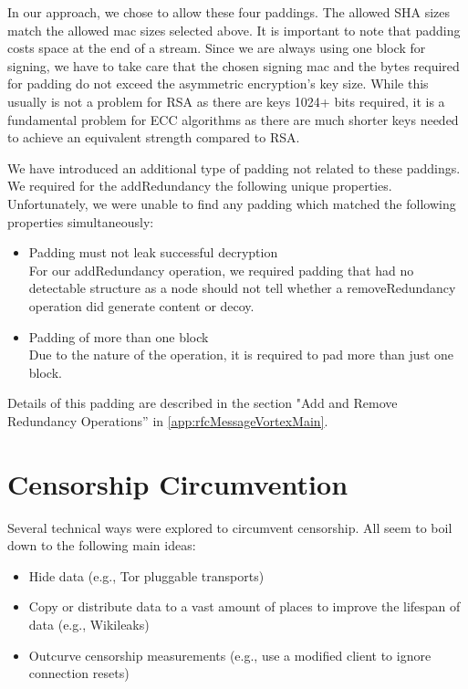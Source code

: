 In our approach, we chose to allow these four paddings. The allowed SHA sizes match the allowed mac sizes selected above. It is important to note that padding costs space at the end of a stream. Since we are always using one block for signing, we have to take care that the chosen signing mac and the bytes required for padding do not exceed the asymmetric encryption's key size. While this usually is not a problem for RSA as there are keys 1024+ bits required, it is a fundamental problem for ECC algorithms as there are much shorter keys needed to achieve an equivalent strength compared to RSA. 

We have introduced an additional type of padding not related to these paddings. We required for the addRedundancy the following unique properties. Unfortunately, we were unable to find any padding which matched the following properties simultaneously:

\begin{itemize}
	\item Padding must not leak successful decryption\\
	For our addRedundancy operation, we required padding that had no detectable structure as a node should not tell whether a removeRedundancy operation did generate content or decoy. 
	\item Padding of more than one block\\
	Due to the nature of the operation, it is required to pad more than just one block.
\end{itemize}

Details of this padding are described in the section "Add and Remove Redundancy Operations'' in \cref{app:rfcMessageVortexMain}. 

\chapter{Censorship Circumvention}\label{sec:censorshipResearch}
Several technical ways were explored to circumvent censorship. All seem to boil down to the following main ideas:
\begin{itemize}
	\item Hide data (e.g., Tor pluggable transports)
	\item Copy or distribute data to a vast amount of places to improve the lifespan of data (e.g., Wikileaks)
	\item Outcurve censorship measurements (e.g., use a modified client to ignore connection resets)
\end{itemize}

